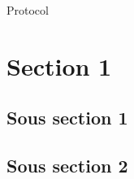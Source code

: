 \minitoc
\newpage



Protocol



\section{Section 1}
\subsection{Sous section 1}
\blindtext
\subsection{Sous section 2}
\blindtext



